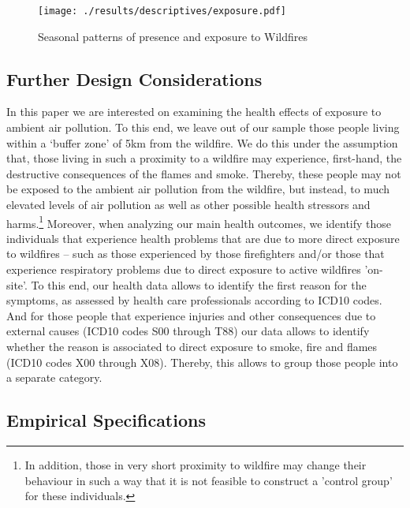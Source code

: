 \documentclass[11pt]{article}
\begin{document}
\begin{spacing}{1.5}
\begin{figure}
    \centering
    \texttt{[image: ./results/descriptives/exposure.pdf]}
    \caption{Seasonal patterns of presence and exposure to Wildfires}
    \label{fig:time}
\end{figure}    

\subsection{Further Design Considerations}
\label{sscn:Outcomes_design}

In this paper we are interested on examining the health effects of exposure to ambient air pollution. To this end, we leave out of our sample those people living within a `buffer zone' of 5km from the wildfire. We do this under the assumption that, those living in such a proximity to a wildfire may experience, first-hand, the destructive consequences of the flames and smoke. Thereby, these people may not be exposed to the ambient air pollution from the wildfire, but instead, to much elevated levels of air pollution as well as other possible health stressors and harms.\footnote{In addition, those in very short proximity to wildfire may change their behaviour in such a way that it is not feasible to  construct a 'control group' for these individuals.} Moreover, when analyzing our main health outcomes, we identify those individuals that experience health problems that are due to more direct exposure to wildfires -- such as those experienced by those firefighters and/or those that experience respiratory problems due to direct exposure to active wildfires 'on-site'. To this end, our health data allows to identify the first reason for the symptoms, as assessed by health care professionals according to ICD10 codes. And for those people that experience injuries and other consequences due to external causes (ICD10 codes S00 through T88) our data allows to identify whether the reason is associated to direct exposure to smoke, fire and flames (ICD10 codes X00 through X08). Thereby, this allows to group those people into a separate category.


\subsection{Empirical Specifications}
\label{sscn:empirics}

\end{spacing}
\end{document}
